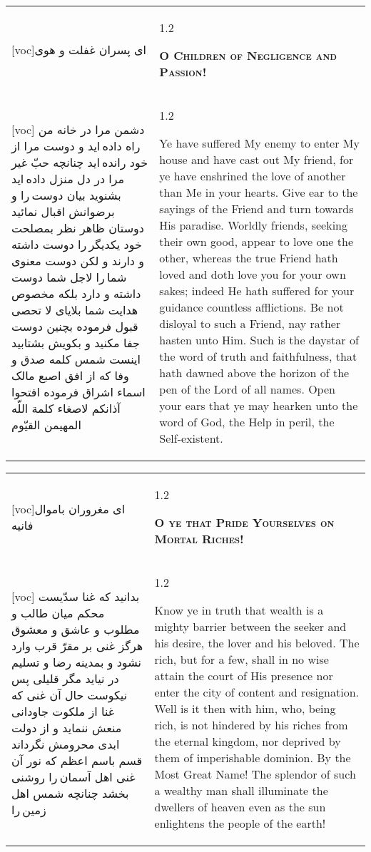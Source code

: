 \documentclass[11pt]{article}
\makeatletter
\newenvironment{orig}
  {\begin{farsi}[voc]}
  {\end{farsi}}
\newenvironment{trans}
  {\Large\begin{spacing}{1.2}\raggedright}
  {\end{spacing}}
\newenvironment{word}
  {\begin{tabular}[t]{p{2.75in}@{\hspace{3em}}p{2.75in}}}
  {\end{tabular}}
\newcommand{\ayat}[2]{\begin{orig}#1\end{orig} & \begin{trans}#2\end{trans}}
\newcommand{\heading}[2]{\textsc{\textbf{#1}} %
}
\makeatother
\begin{document}
\pagebreak

\begin{word}
\ayat{ای پسران غفلت و هوی}{\heading{O Children of Negligence and Passion!}{}} \\ \ayat{
دشمن مرا در خانه من راه داده ايد و دوست مرا از خود رانده ايد چنانچه حبّ غير مرا در دل منزل داده ايد
بشنويد بيان دوست را و برضوانش اقبال نمائيد
دوستان ظاهر نظر بمصلحت خود يکديگر را دوست داشته و دارند و لکن دوست معنوی شما را لاجل شما دوست داشته و دارد بلکه مخصوص هدايت شما بلايای لا تحصی قبول فرموده
بچنين دوست جفا مکنيد و بکويش بشتابيد
اينست شمس کلمه صدق و وفا که از افق اصبع مالک اسماء اشراق فرموده
افتحوا آذانکم لاصغاء کلمة اللّه المهيمن القيّوم
}{
  Ye have suffered My enemy to enter My house and have cast out My friend, for
  ye have enshrined the love of another than Me in your hearts. Give ear to
  the sayings of the Friend and turn towards His paradise. Worldly friends,
  seeking their own good, appear to love one the other, whereas the true
  Friend hath loved and doth love you for your own sakes; indeed He hath
  suffered for your guidance countless afflictions. Be not disloyal to such a
  Friend, nay rather hasten unto Him. Such is the daystar of the word of truth
  and faithfulness, that hath dawned above the horizon of the pen of the Lord
  of all names. Open your ears that ye may hearken unto the word of God, the
  Help in peril, the Self-existent.
}
\end{word}

\pagebreak

\begin{word}
\ayat{ای مغروران باموال فانيه}{\heading{O ye that Pride Yourselves on Mortal Riches!}{}} \\ \ayat{
بدانيد که غنا سدّيست محکم ميان طالب و مطلوب و عاشق و معشوق هرگز غنی بر مقرّ قرب وارد نشود و بمدينه رضا و تسليم در نيايد مگر قليلی
پس نيکوست حال آن غنی که غنا از ملکوت جاودانی منعش ننمايد و از دولت ابدی محرومش نگرداند
قسم باسم اعظم که نور آن غنی اهل آسمان را روشنی بخشد چنانچه شمس اهل زمين را
}{
  Know ye in truth that wealth is a mighty barrier between the seeker and his
  desire, the lover and his beloved. The rich, but for a few, shall in no wise
  attain the court of His presence nor enter the city of content and
  resignation. Well is it then with him, who, being rich, is not hindered by
  his riches from the eternal kingdom, nor deprived by them of imperishable
  dominion. By the Most Great Name! The splendor of such a wealthy man shall
  illuminate the dwellers of heaven even as the sun enlightens the people of
  the earth!
}
\end{word}
\end{document}
